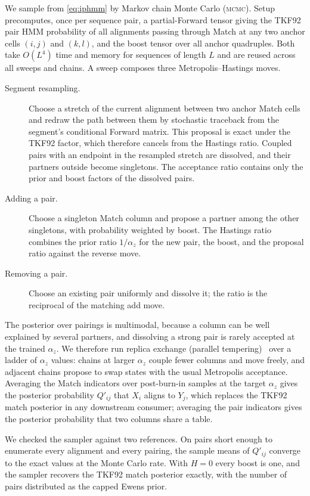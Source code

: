 \documentclass[11pt]{article}
\newcommand{\MCMC}{\textsc{mcmc}}
\begin{document}
We sample from \cref{eq:iphmm} by Markov chain Monte Carlo (\MCMC). Setup
precomputes, once per sequence pair, a partial-Forward tensor giving the
TKF92 pair HMM probability of all alignments passing through Match at any two
anchor cells $(i,j)$ and $(k,l)$, and the boost tensor over all anchor
quadruples. Both take $O(L^4)$ time and memory for sequences of length $L$ and
are reused across all sweeps and chains. A sweep composes three
Metropolis--Hastings moves.
\begin{description}
\item[Segment resampling.] Choose a stretch of the current alignment between
two anchor Match cells and redraw the path between them by stochastic
traceback from the segment's conditional Forward matrix. This proposal is
exact under the TKF92 factor, which therefore cancels from the Hastings
ratio. Coupled pairs with an endpoint in the resampled stretch are dissolved,
and their partners outside become singletons. The acceptance ratio contains
only the prior and boost factors of the dissolved pairs.
\item[Adding a pair.] Choose a singleton Match column and propose a partner
among the other singletons, with probability weighted by boost. The Hastings
ratio combines the prior ratio $1/\alpha_z$ for the new pair, the boost, and
the proposal ratio against the reverse move.
\item[Removing a pair.] Choose an existing pair uniformly and dissolve it;
the ratio is the reciprocal of the matching add move.
\end{description}
The posterior over pairings is multimodal, because a column can be well
explained by several partners, and dissolving a strong pair is rarely
accepted at the trained $\alpha_z$. We therefore run replica exchange
(parallel tempering)~\citep{Geyer1991,HukushimaNemoto1996} over a ladder of
$\alpha_z$ values: chains at larger $\alpha_z$ couple fewer columns and move
freely, and adjacent chains propose to swap states with the usual Metropolis
acceptance. Averaging the Match indicators over post-burn-in samples at the
target $\alpha_z$ gives the posterior probability $Q'_{ij}$ that $X_i$ aligns
to $Y_j$, which replaces the TKF92 match posterior in any downstream
consumer; averaging the pair indicators gives the posterior probability that
two columns share a table.

We checked the sampler against two references. On pairs short enough to
enumerate every alignment and every pairing, the sample means of $Q'_{ij}$
converge to the exact values at the Monte Carlo rate. With $H=0$ every boost
is one, and the sampler recovers the TKF92 match posterior exactly, with the
number of pairs distributed as the capped Ewens prior.
\end{document}
